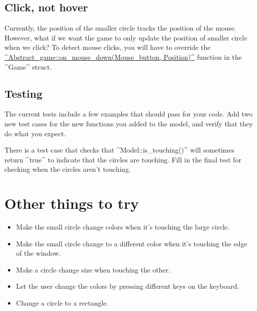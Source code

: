 \documentclass{tufte-handout}
\begin{document}
\subsection{Click, not hover}

Currently, the position of the smaller circle tracks the position of the
mouse. However, what if we want the game to only update the position of
smaller circle when we click? To detect mouse clicks, you will have to
override the
\href{https://bit.ly/39jNovM}
{^Abstract_game::on_mouse_down(Mouse_button, Position)^}
function in the ^Game^ struct.

\subsection{Testing}

The current tests include a few examples that should pass
for your code. Add two new test cases for the new functions you added to
the model, and verify that they do what you expect.

There is a test case that checks that ^Model::is_touching()^ will
sometimes return ^true^ to indicate that the circles are touching.
Fill in the final test for checking when the circles aren't touching.

\section{Other things to try}

\begin{itemize}

  \item Make the small circle change colors when it's touching
    the large circle.

  \item Make the small circle change to a different color when it's
    touching the edge of the window.

  \item Make a circle change size when touching the other.

  \item Let the user change the colors by pressing different keys on the
    keyboard.

  \item Change a circle to a rectangle.


\end{itemize}
\end{document}
